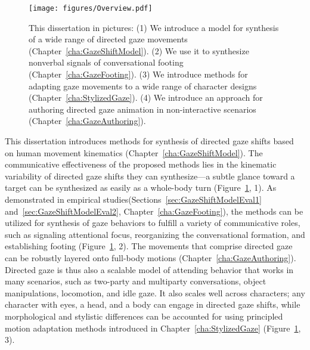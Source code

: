 \begin{figure}
\centering
\texttt{[image: figures/Overview.pdf]}
\caption{This dissertation in pictures: (1) We introduce a model for synthesis of a wide range of directed gaze movements (Chapter~\ref{cha:GazeShiftModel}). (2) We use it to synthesize nonverbal signals of conversational footing (Chapter~\ref{cha:GazeFooting}). (3) We introduce methods for adapting gaze movements to a wide range of character designs (Chapter~\ref{cha:StylizedGaze}). (4) We introduce an approach for authoring directed gaze animation in non-interactive scenarios (Chapter~\ref{cha:GazeAuthoring}).}
\label{fig:Overview}
\end{figure}

This dissertation introduces methods for synthesis of directed gaze shifts based on human movement kinematics (Chapter~\ref{cha:GazeShiftModel}). The communicative effectiveness of the proposed methods lies in the kinematic variability of directed gaze shifts they can synthesize---a subtle glance toward a target can be synthesized as easily as a whole-body turn (Figure~\ref{fig:Overview}, 1). As demonstrated in empirical studies(Sections~\ref{sec:GazeShiftModelEval1} and~\ref{sec:GazeShiftModelEval2}, Chapter~\ref{cha:GazeFooting}), the methods can be utilized for synthesis of gaze behaviors to fulfill a variety of communicative roles, such as signaling attentional focus, reorganizing the conversational formation, and establishing footing (Figure~\ref{fig:Overview}, 2). The movements that comprise directed gaze can be robustly layered onto full-body motions (Chapter~\ref{cha:GazeAuthoring}). Directed gaze is thus also a scalable model of attending behavior that works in many scenarios, such as two-party and multiparty conversations, object manipulations, locomotion, and idle gaze. It also scales well across characters; any character with eyes, a head, and a body can engage in directed gaze shifts, while morphological and stylistic differences can be accounted for using principled motion adaptation methods introduced in Chapter~\ref{cha:StylizedGaze} (Figure~\ref{fig:Overview}, 3).

